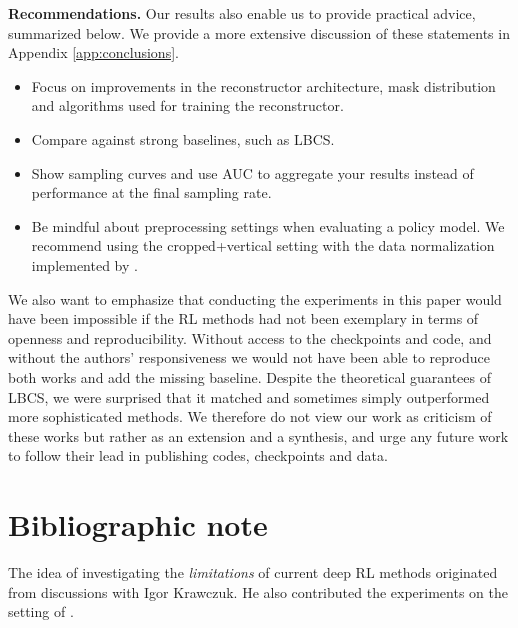 \textbf{Recommendations.} Our results also enable us to provide practical advice, summarized below. We provide a more extensive discussion of these statements in Appendix \ref{app:conclusions}.\vspace{-.1cm}
\begin{itemize}
    \item Focus on improvements in the reconstructor architecture, mask distribution and algorithms used for training the reconstructor.\\[-4mm]
    \item Compare against strong baselines, such as LBCS.\\[-4mm]
    \item Show sampling curves and use AUC to aggregate your results instead of performance at the final sampling rate.\\[-4mm]
    \item Be mindful about preprocessing settings when evaluating a policy model. We recommend using the cropped+vertical setting with the data normalization implemented by \citet{zbontarFastMRIOpenDataset2019}.
\end{itemize}\vspace{-.1cm}

We also want to emphasize that conducting the experiments in this paper would have been impossible if the RL methods had not been exemplary in terms of openness and reproducibility. Without access to the checkpoints and code, and without the authors' responsiveness we would not have been able to reproduce both works and add the missing baseline. Despite the theoretical guarantees of LBCS, we were surprised that it matched and sometimes simply outperformed more sophisticated methods.
We therefore do not view our work as criticism of these works but rather as an extension and a synthesis, and urge any future work to follow their lead in publishing codes, checkpoints and data.

\section*{Bibliographic note}
The idea of investigating  the \textit{limitations} of current deep RL methods originated from discussions with Igor Krawczuk. He also contributed the experiments on the setting of \citet{pineda2020active}.


